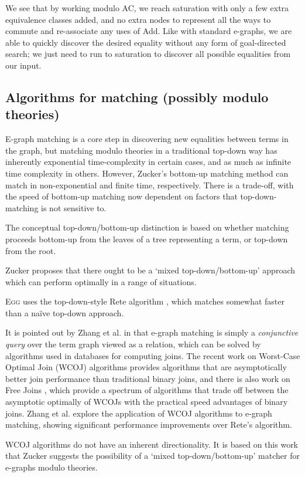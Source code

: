 \documentclass{article}
\begin{document}
We see that by working modulo AC, we reach saturation with only a few extra equivalence classes added, and no extra nodes to represent all the ways to commute and re-associate any uses of Add. Like with standard e-graphs, we are able to quickly discover the desired equality without any form of goal-directed search; we just need to run to saturation to discover all possible equalities from our input.

\subsection{Algorithms for matching (possibly modulo theories)}
E-graph matching is a core step in discovering new equalities between terms in the graph, but matching modulo theories in a traditional top-down way has inherently exponential time-complexity in certain cases, and as much as infinite time complexity in others. However, Zucker's bottom-up matching method can match in non-exponential and finite time, respectively. There is a trade-off, with the speed of bottom-up matching now dependent on factors that top-down-matching is not sensitive to.

The conceptual top-down/bottom-up distinction is based on whether matching proceeds bottom-up from the leaves of a tree representing a term, or top-down from the root.

Zucker proposes that there ought to be a `mixed top-down/bottom-up' approach which can perform optimally in a range of situations.

\textsc{Egg} uses the top-down-style Rete algorithm \cite{forgy1989rete}, which matches somewhat faster than a na\"ive top-down approach.

It is pointed out by Zhang et al. in \citep{zhang2021relational} that e-graph matching is simply a \textit{conjunctive query} over the term graph viewed as a relation, which can be solved by algorithms used in databases for computing joins. The recent work on
Worst-Case Optimal Join (WCOJ) algorithms \cite{ngo2018worst} provides algorithms that are asymptotically better join performance than traditional binary joins, and there is also work on Free Joins \cite{wang2023free}, which provide a spectrum of algorithms that trade off between the asymptotic optimally of WCOJs with the practical speed advantages of binary joins. Zhang et al. explore the application of WCOJ algorithms to e-graph matching, showing significant performance improvements over Rete's algorithm.

WCOJ algorithms do not have an inherent directionality. It is based on this work that Zucker suggests the possibility of a `mixed top-down/bottom-up' matcher for e-graphs modulo theories.
\end{document}

